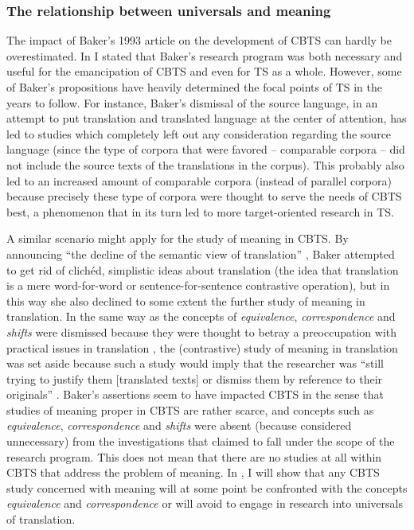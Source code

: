 \subsubsection{The relationship between universals and meaning}
\label{sec:2.2.2.6}  
The impact of Baker’s 1993 article on the development of CBTS can hardly be overestimated. In  I stated that Baker’s research program was both necessary and useful for the emancipation of CBTS and even for TS as a whole. However, some of Baker’s propositions have heavily determined the focal points of TS in the years to follow. For instance, Baker’s dismissal of the source language, in an attempt to put translation and translated language at the center of attention, has led to studies which completely left out any consideration regarding the source language (since the type of corpora that were favored – comparable corpora – did not include the source texts of the translations in the corpus). This probably also led to an increased amount of comparable corpora (instead of parallel corpora) because precisely these type of corpora were thought to serve the needs of CBTS best, a phenomenon that in its turn led to more target-oriented research in TS.

A similar scenario might apply for the study of meaning in CBTS. By announcing “the decline of the semantic view of translation” \citep[237]{baker_corpus_1993}, Baker attempted to get rid of clichéd, simplistic ideas about translation (the idea that translation is a mere word-for-word or sentence-for-sentence contrastive operation), but in this way she also declined to some extent the further study of meaning in translation. In the same way as the concepts of \textit{equivalence}, \textit{correspondence} and \textit{shifts} were dismissed because they were thought to betray a preoccupation with practical issues in translation \citep[235]{baker_corpus_1993}, the (contrastive) study of meaning in translation was set aside because such a study would imply that the researcher was “still trying to justify them [translated texts] or dismiss them by reference to their originals” \citep[235]{baker_corpus_1993}. Baker’s assertions seem to have impacted CBTS in the sense that studies of meaning proper in CBTS are rather scarce, and concepts such as \textit{equivalence}, \textit{correspondence} and \textit{shifts} were absent (because considered unnecessary) from the investigations that claimed to fall under the scope of the research program. This does not mean that there are no studies at all within CBTS that address the problem of meaning. In , I will show that any CBTS study concerned with meaning will at some point be confronted with the concepts \textit{equivalence} and \textit{correspondence} or will avoid to engage in research into universals of translation.

